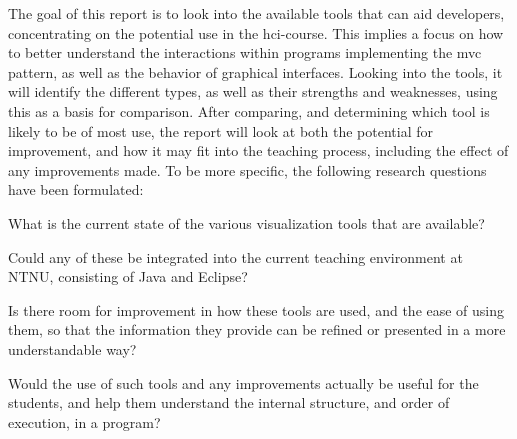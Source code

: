The goal of this report is to look into the available tools that can aid developers, concentrating on the potential use in the \gls{hci}-course.
This implies a focus on how to better understand the interactions within programs implementing the \gls{mvc} pattern, as well as the behavior of graphical interfaces.
Looking into the tools, it will identify the different types, as well as their strengths and weaknesses, using this as a basis for comparison.
After comparing, and determining which tool is likely to be of most use, the report will look at both the potential for improvement, and how it may fit into the teaching process, including the effect of any improvements made.
To be more specific, the following research questions have been formulated:
\begin{theorem}
What is the current state of the various visualization tools that are available?
\end{theorem}
\begin{theorem}
Could any of these be integrated into the current teaching environment at NTNU, consisting of Java and Eclipse? %
\end{theorem}
\begin{theorem}
Is there room for improvement in how these tools are used, and the ease of using them, so that the information they provide can be refined or presented in a more understandable way? %
\end{theorem}
\begin{theorem}
Would the use of such tools and any improvements actually be useful for the students, and help them understand the internal structure, and order of execution, in a program?%
\end{theorem}
